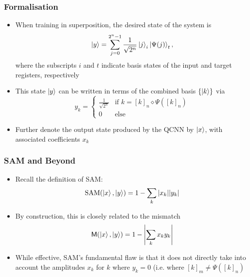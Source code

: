 \documentclass{beamer}
\begin{document}
\begin{frame}
\frametitle{Formalisation}
\begin{itemize}
\item When training in superposition, the \alert{desired state} of the system is 
\begin{equation}
\ket{y} = \sum_{j=0}^{2^n-1} \frac{1}{\sqrt{2^n}} \ket{j}_i \ket{\Psi(j)}_t,
\end{equation}
where the subscripts $i$ and $t$ indicate basis states of the input and target registers, respectively
\item This state $\ket{y}$ can be written in terms of the \alert{combined basis} $\{ \ket{k} \}$ via 
\begin{equation}
y_k = \begin{cases}
\frac{1}{\sqrt{2^n}}  & \text{if } k=[k]_n \diamond \Psi([k]_n) \\
0 & \text{else} 
\end{cases}
\end{equation}
\item Further denote the \alert{output state} produced by the QCNN by $\ket{x}$, with associated coefficients $x_k$
\end{itemize}
\end{frame}

\begin{frame}
\frametitle{SAM and Beyond}
\begin{itemize}
\item Recall the definition of \alert{SAM}:
\begin{equation}
\text{SAM}(\ket{x}, \ket{y}) = 1 - \sum_k |x_k| | y_k |  
\end{equation}
\item By construction, this is closely related to the \alert{mismatch} 
\begin{equation}
\mathsf{M}(\ket{x}, \ket{y}) = 1 - \left|\sum_k x_k y_k\right|
\end{equation}
\item While effective, SAM's \alert{fundamental flaw} is that it does not directly take into account the amplitudes $x_k$ for $k$ where $y_k =0$ (i.e. where $[k]_m \neq \Psi([k]_n)$
\end{itemize}
\end{frame}
\end{document}
